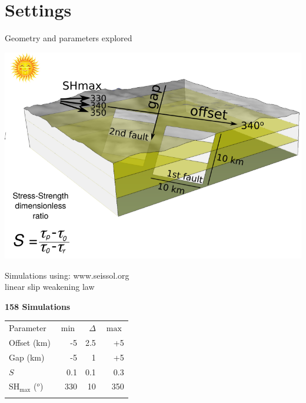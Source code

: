 \documentclass{beamer}
\begin{document}
\section{Settings}

\begin{frame}
 {Geometry and parameters explored}

 \vskip -0.2cm
 \centering \includegraphics[width=0.9\linewidth]{images/model_no_table_eq}
 \begin{minipage}{0.45\linewidth}
 \vskip -0.3cm
   {\scriptsize Simulations using: www.seissol.org} \\
   \vskip -0.7cm
   {\scriptsize linear slip weakening law} \\   
   \vskip -0.7cm
   {\tiny \citep[e.g.,][]{Wollherr_2018_OFP, Ulrich_2019_CPB}}
 \end{minipage}
 \begin{minipage}{0.45\linewidth}
 \vskip -1.8cm \hskip 2cm \textbf{158 Simulations} \\
 \vskip -1cm
 \hskip 2cm \begin{tabular}{l | r | r | r}
  Parameter           & $\min$ & $\Delta$ & $\max$  \\ \pause
  Offset (km)         & -5     & 2.5      & +5      \\ \pause
  Gap (km)            & -5     & 1        & +5      \\ \pause
  $S$                 & 0.1    & 0.1      & 0.3     \\ \pause
  SH$_{\max}$ ($^o$)  & 330    & 10       & 350     \\ \pause
 \end{tabular}
 \end{minipage}

\end{frame}
\end{document}
